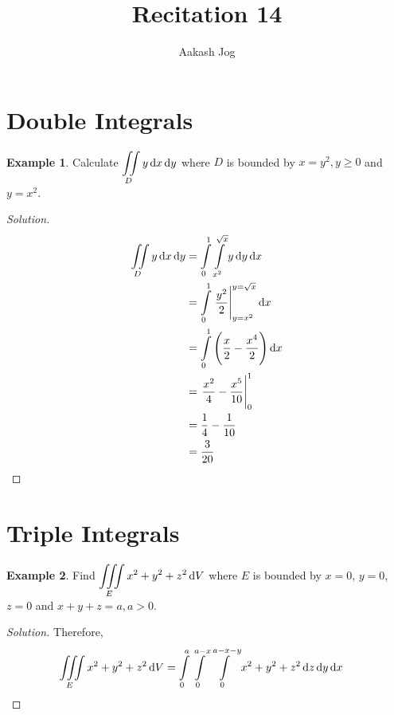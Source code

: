 \documentclass[fleqn, 12pt]{article}
\title{Recitation 14}
\author{Aakash Jog}
\date{\formatdate{21}{1}{2015}}
\theoremstyle{definition}
\newtheorem{example}{Example}
\theoremstyle{theorem}
\newenvironment{solution}
{\begin{proof}[Solution]\let\qed\relax}
	{\end{proof}}
\begin{document}
\maketitle

\tableofcontents

\newpage
\section{Double Integrals}

\begin{example}
	Calculate $\displaystyle \iint\limits_{D} y \dif x \dif y$ where $D$ is bounded by $x = y^2, y \geq 0$ and $y = x^2$.
\end{example}

\begin{solution}
	\begin{align*}
		\iint\limits_D y \dif x \dif y &= \int\limits_{0}^{1} \int\limits_{x^2}^{\sqrt{x}} y \dif y \dif x\\
		&= \int\limits_{0}^{1} \left. \dfrac{y^2}{2} \right|_{y = x^2}^{y = \sqrt{x}} \dif x\\
		&= \int\limits_{0}^{1} \left( \dfrac{x}{2} - \dfrac{x^4}{2} \right) \dif x\\
		&= \left. \dfrac{x^2}{4} - \dfrac{x^5}{10} \right|_{0}^{1}\\
		&= \dfrac{1}{4} - \dfrac{1}{10}\\
		&= \dfrac{3}{20}
	\end{align*}
\end{solution}

\section{Triple Integrals}

\begin{example}
	Find $\displaystyle \iiint\limits_{E} x^2 + y^2 + z^2 \dif V$ where $E$ is bounded by $x = 0$, $y = 0$, $z = 0$ and $x + y + z = a, a > 0$.
\end{example}

\begin{solution}
	Therefore,
	\begin{align*}
		\iiint\limits_{E} x^2 + y^2 + z^2 \dif V &= \int\limits_{0}^{a} \int\limits_{0}^{a - x} \int\limits_{0}^{a - x - y} x^2 + y^2 + z^2 \dif z \dif y \dif x
	\end{align*}
\end{solution}
\end{document}
